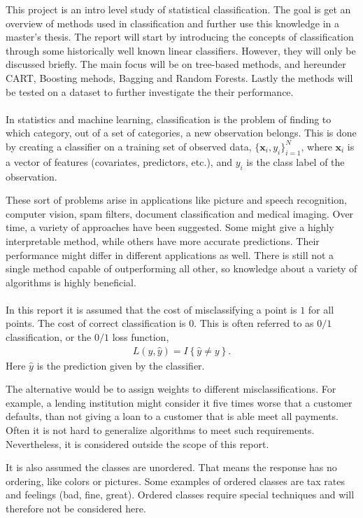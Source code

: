 %
This project is an intro level study of statistical classification. The goal is get an overview of methods used in classification and further use this knowledge in a master's thesis. The report will start by introducing the concepts of classification through some historically well known linear classifiers. However, they will only be discussed briefly. The main focus will be on tree-based methods, and hereunder CART, Boosting mehods, Bagging and Random Forests. Lastly the methods will be tested on a dataset to further investigate the their performance. 
\\
\\
In statistics and machine learning, classification is the problem of finding to which category, out of a set of categories, a new observation belongs. This is done by creating a classifier on a training set of observed data, $\{\mathbf{x}_i, y_i\}_{i = 1}^N$, where $\mathbf{x}_i$ is a vector of features (covariates, predictors, etc.), and $y_i$ is the class label of the observation. 

These sort of problems arise in applications like picture and speech recognition, computer vision, spam filters, document classification and medical imaging.
Over time, a variety of approaches have been suggested. Some might give a highly interpretable method, while others have more accurate predictions. Their performance might differ in different applications as well. There is still not a single method capable of outperforming all other, so knowledge about a variety of algorithms is highly beneficial. 
\\
\\
In this report it is assumed that the cost of misclassifying a point is $1$ for all points. The cost of correct classification is $0$. This is often referred to as $0/1$ classification, or the $0/1$ loss function, 
\begin{align}
  L(y, \hat y) = I\left\{ \hat y \neq y \right\}.
\end{align}
Here $\hat y$ is the prediction given by the classifier. 

The alternative would be to assign weights to different misclassifications. For example, a lending institution might consider it five times worse that a customer defaults, than not giving a loan to a customer that is able meet all payments. Often it is not hard to generalize algorithms to meet such requirements. Nevertheless,  it is considered outside the scope of this report.

It is also assumed the classes are unordered. That means the response has no ordering, like colors or pictures. Some examples of ordered classes are tax rates and feelings (bad, fine, great). Ordered classes require special techniques and will therefore not be considered here. 



